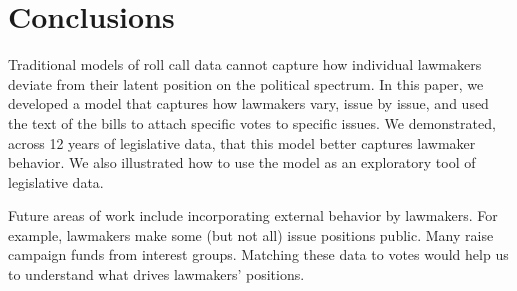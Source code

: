 




\section*{Conclusions}


Traditional models of roll call data cannot capture how individual
lawmakers deviate from their latent position on the political
spectrum.  In this paper, we developed a model that captures how
lawmakers vary, issue by issue, and used the text of the bills to
attach specific votes to specific issues.  We demonstrated, across 12
years of legislative data, that this model better captures lawmaker
behavior.  We also illustrated how to use the model as an exploratory tool of legislative data.

Future areas of work include incorporating external behavior by
lawmakers.  For example, lawmakers make some (but not all) issue
positions public.  Many raise campaign funds from interest
groups. Matching these data to votes would help us to understand what
drives lawmakers' positions.
